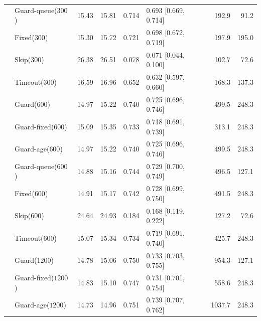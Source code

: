 \documentclass[mathematics,supfile,submit,moreauthors]{Definitions/mdpi}
\newcommand{\devnum}[1]{#1}
\begin{document}
\begin{table}[p]
\begin{tabular}{llrrrlrr}
 & Guard-queue($\devnum{300}$) & \devnum{15.43} & \devnum{15.81} & \devnum{0.714} & \devnum{0.693 [0.669, 0.714]} & \devnum{192.9} & \devnum{91.2} \\
 & Fixed($\devnum{300}$)  & \devnum{15.30} & \devnum{15.72} & \devnum{0.721} & \devnum{0.698 [0.672, 0.719]} & \devnum{197.9} & \devnum{195.0} \\
 & Skip($\devnum{300}$)   & \devnum{26.38} & \devnum{26.51} & \devnum{0.078} & \devnum{0.071 [0.044, 0.100]} & \devnum{102.7} & \devnum{72.6} \\
 & Timeout($\devnum{300}$) & \devnum{16.59} & \devnum{16.96} & \devnum{0.652} & \devnum{0.632 [0.597, 0.660]} & \devnum{168.3} & \devnum{137.3} \\
 & Guard($\devnum{600}$)  & \devnum{14.97} & \devnum{15.22} & \devnum{0.740} & \devnum{0.725 [0.696, 0.746]} & \devnum{499.5} & \devnum{248.3} \\
 & Guard-fixed($\devnum{600}$) & \devnum{15.09} & \devnum{15.35} & \devnum{0.733} & \devnum{0.718 [0.691, 0.739]} & \devnum{313.1} & \devnum{248.3} \\
 & Guard-age($\devnum{600}$) & \devnum{14.97} & \devnum{15.22} & \devnum{0.740} & \devnum{0.725 [0.696, 0.746]} & \devnum{499.5} & \devnum{248.3} \\
 & Guard-queue($\devnum{600}$) & \devnum{14.88} & \devnum{15.16} & \devnum{0.744} & \devnum{0.729 [0.700, 0.749]} & \devnum{496.5} & \devnum{127.1} \\
 & Fixed($\devnum{600}$)  & \devnum{14.91} & \devnum{15.17} & \devnum{0.742} & \devnum{0.728 [0.699, 0.750]} & \devnum{491.5} & \devnum{248.3} \\
 & Skip($\devnum{600}$)   & \devnum{24.64} & \devnum{24.93} & \devnum{0.184} & \devnum{0.168 [0.119, 0.222]} & \devnum{127.2} & \devnum{72.6} \\
 & Timeout($\devnum{600}$) & \devnum{15.07} & \devnum{15.34} & \devnum{0.734} & \devnum{0.719 [0.691, 0.740]} & \devnum{425.7} & \devnum{248.3} \\
 & Guard($\devnum{1200}$) & \devnum{14.78} & \devnum{15.06} & \devnum{0.750} & \devnum{0.733 [0.703, 0.755]} & \devnum{954.3} & \devnum{127.1} \\
 & Guard-fixed($\devnum{1200}$) & \devnum{14.83} & \devnum{15.10} & \devnum{0.747} & \devnum{0.731 [0.701, 0.754]} & \devnum{558.6} & \devnum{248.3} \\
 & Guard-age($\devnum{1200}$) & \devnum{14.73} & \devnum{14.96} & \devnum{0.751} & \devnum{0.739 [0.707, 0.762]} & \devnum{1037.7} & \devnum{248.3} \\

\end{tabular}
\end{table}
\end{document}
